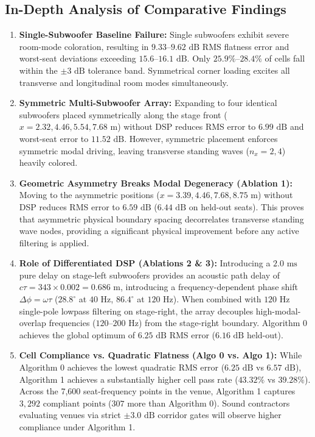 \documentclass[11pt,a4paper,titlepage]{article}
\begin{document}
\subsection{In-Depth Analysis of Comparative Findings}
\begin{enumerate}
    \item \textbf{Single-Subwoofer Baseline Failure:} Single subwoofers exhibit severe room-mode coloration, resulting in $9.33\text{--}9.62\text{ dB}$ RMS flatness error and worst-seat deviations exceeding $15.6\text{--}16.1\text{ dB}$. Only $25.9\%\text{--}28.4\%$ of cells fall within the $\pm 3\text{ dB}$ tolerance band. Symmetrical corner loading excites all transverse and longitudinal room modes simultaneously.
    \item \textbf{Symmetric Multi-Subwoofer Array:} Expanding to four identical subwoofers placed symmetrically along the stage front ($x = 2.32, 4.46, 5.54, 7.68\text{ m}$) without DSP reduces RMS error to $6.99\text{ dB}$ and worst-seat error to $11.52\text{ dB}$. However, symmetric placement enforces symmetric modal driving, leaving transverse standing waves ($n_x = 2, 4$) heavily colored.
    \item \textbf{Geometric Asymmetry Breaks Modal Degeneracy (Ablation 1):} Moving to the asymmetric positions ($x = 3.39, 4.46, 7.68, 8.75\text{ m}$) without DSP reduces RMS error to $6.59\text{ dB}$ ($6.44\text{ dB}$ on held-out seats). This proves that asymmetric physical boundary spacing decorrelates transverse standing wave nodes, providing a significant physical improvement before any active filtering is applied.
    \item \textbf{Role of Differentiated DSP (Ablations 2 \& 3):} Introducing a $2.0\text{ ms}$ pure delay on stage-left subwoofers provides an acoustic path delay of $c \tau = 343 \times 0.002 = 0.686\text{ m}$, introducing a frequency-dependent phase shift $\Delta \phi = \omega \tau$ ($28.8^\circ$ at $40\text{ Hz}$, $86.4^\circ$ at $120\text{ Hz}$). When combined with $120\text{ Hz}$ single-pole lowpass filtering on stage-right, the array decouples high-modal-overlap frequencies ($120\text{--}200\text{ Hz}$) from the stage-right boundary. Algorithm 0 achieves the global optimum of $6.25\text{ dB}$ RMS error ($6.16\text{ dB}$ held-out).
    \item \textbf{Cell Compliance vs. Quadratic Flatness (Algo 0 vs. Algo 1):} While Algorithm 0 achieves the lowest quadratic RMS error ($6.25\text{ dB}$ vs $6.57\text{ dB}$), Algorithm 1 achieves a substantially higher cell pass rate ($43.32\%$ vs $39.28\%$). Across the 7,600 seat-frequency points in the venue, Algorithm 1 captures $3,292\text{ compliant points}$ ($307$ more than Algorithm 0). Sound contractors evaluating venues via strict $\pm 3.0\text{ dB}$ corridor gates will observe higher compliance under Algorithm 1.

\end{enumerate}
\end{document}
